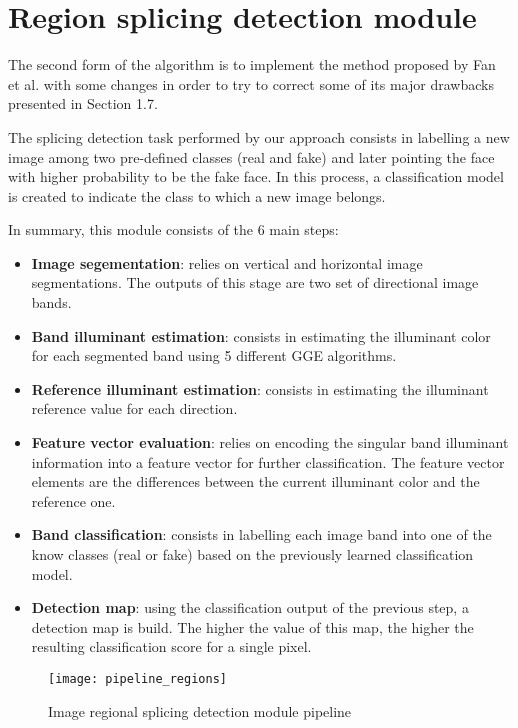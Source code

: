 \section{Region splicing detection module}

The second form of the algorithm is to implement the method proposed by Fan et al.\cite{fan2015image} with some changes in order to try to correct some of its major drawbacks presented in Section 1.7.

The splicing detection task performed by our approach consists in labelling a new image among two pre-defined classes (real and fake) and later pointing the face with higher probability to be the fake face. In this process, a classification model is created to indicate the class to which a new image belongs.

In summary, this module consists of the 6 main steps:

\begin{itemize}
\item \textbf{Image segementation}: relies on vertical and horizontal image segmentations. The outputs of this stage are two set of directional image bands. 
\item \textbf{Band illuminant estimation}: consists in estimating the illuminant color for each segmented band using 5 different GGE algorithms.
\item \textbf{Reference illuminant estimation}: consists in estimating the illuminant reference value for each direction.
\item \textbf{Feature vector evaluation}: relies on encoding the singular band illuminant information into a feature vector for further classification. The feature vector elements are the differences between the current illuminant color and the reference one.
\item \textbf{Band classification}: consists in labelling each image band into one of the know classes (real or fake) based on the previously learned classification model.
\item \textbf{Detection map}: using the classification output of the previous step, a detection map is build. The higher the value of this map, the higher the  resulting classification score for a single pixel.
\end{itemize}

\begin{figure}[h!]
  \centering
    \texttt{[image: pipeline\_regions]}
    \caption{Image regional splicing detection module pipeline}
    \label{fig:regionsmodulepipeline}
\end{figure}

